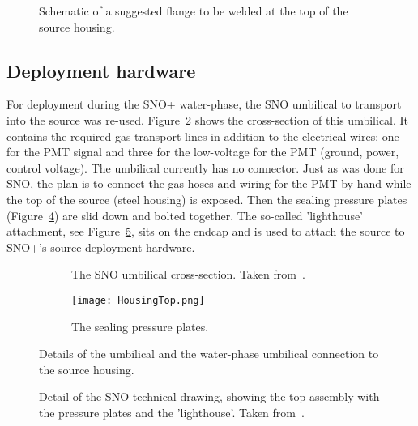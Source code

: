 \begin{figure}
\caption{\label{fig:flange} Schematic of a suggested flange to be welded at the top of the source housing. }
\end{figure}

\subsection{Deployment hardware}

For deployment during the SNO+ water-phase, the SNO \Li umbilical to transport \Li into the source was re-used.
Figure~\ref{fig:sno_umbilical} shows the cross-section of this umbilical. It contains the required gas-transport lines in addition to the electrical wires; one for the PMT signal and three for the low-voltage for the PMT (ground, power, control voltage). 
The umbilical currently has no connector. 
Just as was done for SNO, the plan is to connect the gas hoses and wiring for the PMT by hand while the top of the source (steel housing) is exposed. 
Then the sealing pressure plates (Figure~\ref{fig:pressureplates}) are slid down and bolted together. 
The so-called 'lighthouse' attachment, see Figure~\ref{fig:connection}, sits on the endcap and is used to attach the source to SNO+'s source deployment hardware.

\begin{figure}
\begin{subfigure}{.57\textwidth}
\caption{\label{fig:sno_umbilical} The SNO \Li umbilical cross-section. Taken from~\cite{Tagg:2001}.}
\end{subfigure}
\hspace{0.5cm}
\begin{subfigure}{.35\textwidth}
  \texttt{[image: HousingTop.png]}
  \caption{\label{fig:pressureplates} The sealing pressure plates.}
\end{subfigure}
\caption{Details of the umbilical and the water-phase umbilical connection to the source housing.}
\end{figure}

\begin{figure}
\caption{\label{fig:connection}Detail of the SNO \Li technical drawing, showing the top assembly with the pressure plates and the 'lighthouse'. Taken from~\cite{Tagg:2001}.}
\end{figure}


